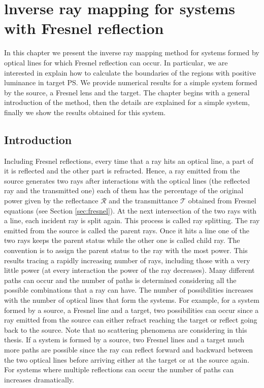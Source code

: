 \chapter{lnverse ray mapping for systems with Fresnel reflection}
\label{chap:fresnel}
In this chapter we present the inverse ray mapping method for systems formed by optical lines for which Fresnel reflection can occur. In particular, we are interested in explain how to calculate the boundaries of the regions with positive luminance in target PS. We provide numerical results for a simple system formed by the source, a Fresnel lens and the target. 
The chapter begins with a general introduction of the method, then the details are explained for a simple system, finally we show the results obtained for this system.
\section{Introduction}
Including Fresnel reflections, every time that a ray hits an optical line, a part of it is reflected and the other part is refracted. 
Hence, a ray emitted from the source generates two rays after interactions with the optical lines (the reflected ray and the transmitted one) each of them has the percentage of the original power given by the reflectance $\mathcal{R}$ and the transmittance $\mathcal{T}$ obtained from Fresnel equations (see Section \ref{sec:fresnel}).
At the next intersection of the two rays with a line, each incident ray is split
again. This process is called ray splitting. The ray emitted from the source is called the parent rays. Once it hits a line one of the two rays keeps the parent status while the other one is called child ray. The convention is to assign the parent status to the ray with the most power.
This results tracing a rapidly increasing number of rays, including those with a very little power (at every interaction the power of the ray decreases). 
Many different paths can occur and the number of paths is determined considering all the possible combinations that a ray can have. The number of possibilities increases with the number of optical lines that form the systems. For example, for a system formed by a source, a Fresnel line and a target, two possibilities can occur since a ray emitted from the source can either refract reaching the target or reflect going back to the source. Note that no scattering phenomena are considering in this thesis. If a system is formed by a source, two Fresnel lines and a target much more paths are possible since the ray can reflect forward and backward between the two optical lines before arriving either at the target or at the source again. For systems where multiple reflections can occur the number of paths can increases dramatically. 
